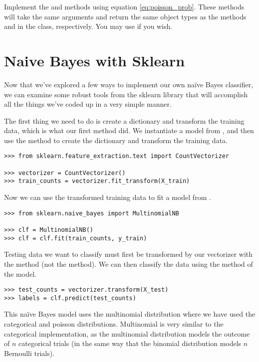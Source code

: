 \begin{problem}
Implement the  and  methods using equation \ref{eq:poisson_prob}. 
These methods will take the same arguments and return the same object types as the methods  and  in the  class, respectively. 
You may use  if you wish.
\end{problem}


\section*{Naive Bayes with Sklearn}
Now that we've explored a few ways to implement our own naïve Bayes classifier, we can examine some robust tools from the sklearn library that will accomplish all the things we've coded up in a very simple manner.

The first thing we need to do is create a dictionary and transform the training data, which is what our first  method did.
We instantiate a  model from , and then use the  method to create the dictionary and transform the training data.
\begin{lstlisting}
>>> from sklearn.feature_extraction.text import CountVectorizer

>>> vectorizer = CountVectorizer()
>>> train_counts = vectorizer.fit_transform(X_train)
\end{lstlisting}
Now we can use the transformed training data to fit a  model from .
\begin{lstlisting}
>>> from sklearn.naive_bayes import MultinomialNB

>>> clf = MultinomialNB()
>>> clf = clf.fit(train_counts, y_train)
\end{lstlisting}
Testing data we want to classify must first be transformed by our vectorizer with the  method (not the  method).
We can then classify the data using the  method of the  model.
\begin{lstlisting}
>>> test_counts = vectorizer.transform(X_test)
>>> labels = clf.predict(test_counts)
\end{lstlisting}
This naïve Bayes model uses the multinomial distribution where we have used the categorical and poisson distributions.
Multinomial is very similar to the categorical implementation, as the multinomial distribution models the outcome of $n$ categorical trials (in the same way that the binomial distribution models $n$ Bernoulli trials).

